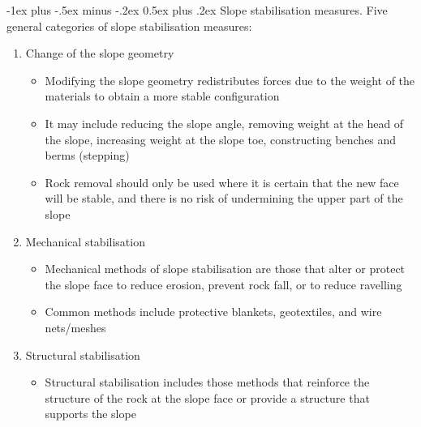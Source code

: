\documentclass[10pt,landscape,a4paper]{article}
\makeatletter
\renewcommand{\section}{\@startsection{section}{1}{0mm}%
	{-1ex plus -.5ex minus -.2ex}%
	{0.5ex plus .2ex}%
	{\normalfont\large\bfseries}}
\makeatother
\begin{document}
\begin{multicols}{3}
		\section{Slope stabilisation measures.}
		Five general categories of slope stabilisation measures:
		\begin{enumerate}
			\item Change of the slope geometry
			\begin{itemize}
				\item Modifying the slope geometry redistributes forces due to the weight of the materials to obtain a more stable configuration
				\item It may include reducing the slope angle, removing weight at the head of the slope, increasing weight at the slope toe, constructing benches and berms (stepping)
				\item Rock removal should only be used where it is certain that the new face will be stable, and there is no risk of undermining the upper part of the slope
			\end{itemize}
			\item Mechanical stabilisation
			\begin{itemize}
				\item Mechanical methods of slope stabilisation are those that alter or protect the slope face to reduce erosion, prevent rock fall, or to reduce ravelling
				\item Common methods include protective blankets, geotextiles, and wire nets/meshes
			\end{itemize}
			\item Structural stabilisation
			\begin{itemize}
				\item Structural stabilisation includes those methods that reinforce the structure of the rock at the slope face or provide a structure that supports the slope

\end{itemize}
\end{enumerate}
\end{multicols}
\end{document}
